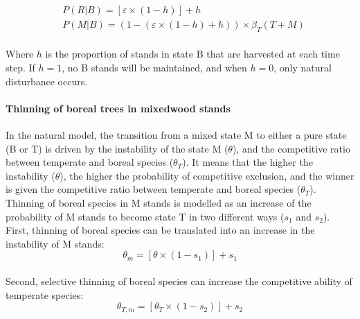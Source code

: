 \begin{equation}
\begin{split}
&P(R|B) = [\varepsilon \times (1 - h)] + h \\[2pt]
&P(M|B) = (1- (\varepsilon \times (1 - h) + h)) \times \beta_T(T + M)
\end{split}
\label{eq:harvestEq}\end{equation}\\

Where \(h\) is the proportion of stands in state B that are harvested at
each time step. If \(h=1\), no B stands will be maintained, and when
\(h=0\), only natural disturbance occurs.\\

\hypertarget{thinning-of-boreal-trees-in-mixedwood-stands}{%
\paragraph{Thinning of boreal trees in mixedwood
stands}\label{thinning-of-boreal-trees-in-mixedwood-stands}}

In the natural model, the transition from a mixed state M to either a
pure state (B or T) is driven by the instability of the state M
(\(\theta\)), and the competitive ratio between temperate and boreal
species (\(\theta_T\)). It means that the higher the instability
(\(\theta\)), the higher the probability of competitive exclusion, and
the winner is given the competitive ratio between temperate and boreal
species (\(\theta_T\)). Thinning of boreal species in M stands is
modelled as an increase of the probability of M stands to become state T
in two different ways (\(s_1\) and \(s_2\)). First, thinning of boreal
species can be translated into an increase in the instability of M
stands:\\

\begin{equation}
  \theta_{m} = [\theta \times (1 - s_1)] + s_1
\label{eq:thinningEq}\end{equation}\\

Second, selective thinning of boreal species can increase the
competitive ability of temperate species:\\

\begin{equation}
\theta_{T, m} = [\theta_{T} \times (1 - s_2)] + s_2
\label{eq:thinningEq2}\end{equation}\\

